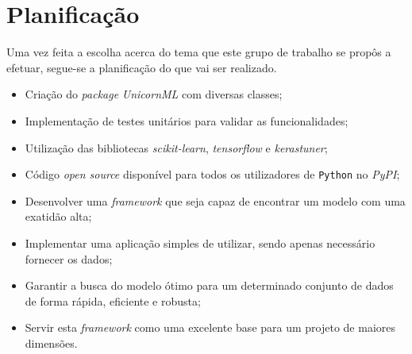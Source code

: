 \documentclass[a4paper]{report}
\begin{document}
\chapter{Planificação} \label{ch:Planning}
\large {
	Uma vez feita a escolha acerca do tema que este grupo de trabalho se propôs a efetuar, segue-se a planificação do que vai ser realizado.
	\begin{itemize}
		\item Criação do \textit{package} \textsl{UnicornML} com diversas classes;
		\item Implementação de testes unitários para validar as funcionalidades;
		\item Utilização das bibliotecas \textit{scikit-learn}, \textit{tensorflow} e \textit{kerastuner};
		\item Código \textit{open source} disponível para todos os utilizadores de \texttt{Python} no \textit{PyPI};
		\item Desenvolver uma \textit{framework} que seja capaz de encontrar um modelo com uma exatidão alta;
		\item Implementar uma aplicação simples de utilizar, sendo apenas necessário fornecer os dados;
		\item Garantir a busca do modelo ótimo para um determinado conjunto de dados de forma rápida, eficiente e robusta;
		\item Servir esta \textit{framework} como uma excelente base para um projeto de maiores dimensões.
	\end{itemize}
}
\end{document}
